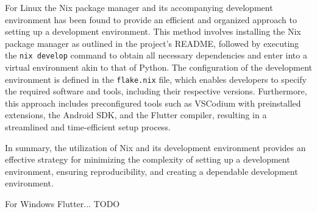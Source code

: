 \documentclass[conference]{IEEEtran}
\begin{document}
For Linux the Nix package manager and its accompanying development environment has been found to provide an efficient and organized approach to setting up a development environment. This method involves installing the Nix package manager as outlined in the project's README, followed by executing the \texttt{nix develop} command to obtain all necessary dependencies and enter into a virtual environment akin to that of Python. The configuration of the development environment is defined in the \texttt{flake.nix} file, which enables developers to specify the required software and tools, including their respective versions. Furthermore, this approach includes preconfigured tools such as VSCodium with preinstalled extensions, the Android SDK, and the Flutter compiler, resulting in a streamlined and time-efficient setup process.

In summary, the utilization of Nix and its development environment provides an effective strategy for minimizing the complexity of setting up a development environment, ensuring reproducibility, and creating a dependable development environment.

For Windows Flutter... TODO

\end{document}
